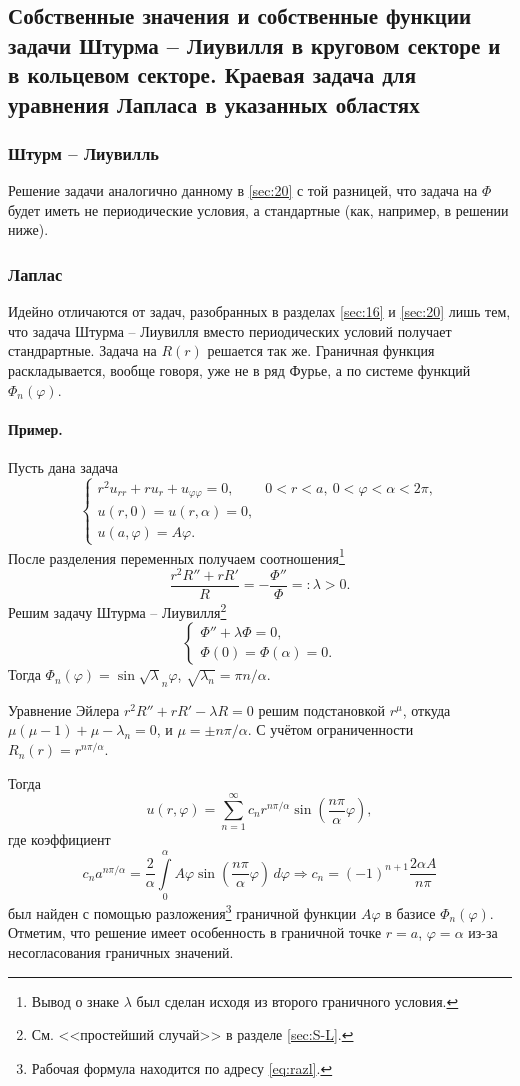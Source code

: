 \subsection{Собственные значения и собственные функции задачи Штурма -- Лиувилля в круговом секторе и в кольцевом секторе. Краевая задача для уравнения Лапласа в указанных областях}
\subsubsection{Штурм -- Лиувилль}
Решение задачи аналогично данному в \ref{sec:20} с той разницей, что задача на
$ \Phi $ будет иметь не периодические условия, а стандартные (как, например,
в решении ниже).

\subsubsection{Лаплас} Идейно отличаются от задач, разобранных в разделах \ref{sec:16} и \ref{sec:20}
лишь тем, что задача Штурма -- Лиувилля вместо периодических условий получает
стандрартные. Задача на $ R(r) $ решается так же. Граничная функция
раскладывается, вообще говоря, уже не в ряд Фурье, а по системе функций $
\Phi_n(\varphi) $.

\paragraph{Пример.} Пусть дана задача  
\[
  \begin{cases}
    r^2u_{rr} + ru_r + u_{\varphi\varphi} = 0, & 0 < r < a, \ 0 < \varphi <
    \alpha < 2\pi,\\
    u(r, 0) = u(r, \alpha) = 0,\\
    u(a, \varphi) = A\varphi.
  \end{cases}
\]
После разделения переменных получаем соотношения\footnote{Вывод о знаке $\lambda
$ был сделан исходя из второго граничного условия.}
\[
    \frac{r^2 R'' + rR'}{R} =-\frac{\Phi''}{\Phi} =: \lambda > 0.
\]
 Решим
задачу Штурма -- Лиувилля\footnote{См. <<простейший случай>> в разделе
\ref{sec:S-L}.}
\[
  \begin{cases}
    \Phi'' + \lambda\Phi = 0,\\
    \Phi(0) = \Phi(\alpha) = 0.
  \end{cases}
\]
Тогда $ \Phi_n(\varphi) = \sin \sqrt\lambda_n\varphi $, $ \sqrt{\lambda_n} = \pi
n/\alpha$. 

Уравнение Эйлера $ r^2R'' + rR' - \lambda R = 0 $ решим подстановкой $ r^\mu $,
откуда $ \mu(\mu-1) + \mu - \lambda_n = 0 $, и $ \mu = \pm n\pi/\alpha $. С
учётом ограниченности $ R_n(r) = r^{n\pi/\alpha} $. 

Тогда  
\[
  u(r, \varphi) = \sum_{n=1}^\infty c_n r^{n\pi/\alpha}\sin \left(
  \frac{n\pi}{\alpha}\varphi \right),
\]
где коэффициент
\[
  c_na^{n\pi/\alpha} = \frac{2}{\alpha} \int\limits_{0}^{\alpha}A\varphi \sin
  \left( \frac{n\pi}{\alpha}\varphi \right) \,d\varphi \Rightarrow
  c_n = (-1)^{n+1} \frac{2\alpha A}{n\pi}
\]
был найден с помощью разложения\footnote{Рабочая формула находится по адресу
\eqref{eq:razl}.} граничной функции $ A\varphi $ в базисе $
\Phi_n(\varphi) $. Отметим, что решение имеет особенность в граничной точке $r =
a$, $\varphi = \alpha$
из-за несогласования граничных значений.
